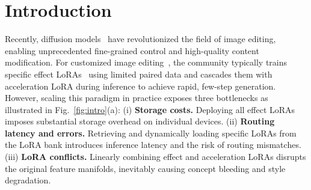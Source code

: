 \section{Introduction}
\label{sec:intro}
Recently, diffusion models~\cite{flux2024,labs2025flux,flux-2-2025,qwenimage,sd1,esser2024scaling,peebles2023scalable} have revolutionized the field of image editing, enabling unprecedented fine-grained control and high-quality content modification. For customized image editing~\cite{mou2025dreamo,gal2022image,kumari2023multi,wu2025dcoardeepconceptinjection, Photodoodle,ye2023ip,zhang2023addingconditionalcontroltexttoimage,guo2025any2anytryon,zhang2025easycontrol,xie2023omnicontrol,huang2024incontextloradiffusiontransformers,liu2025llm4gen,she2025mosaic,liu2025tfcustom}, the community typically trains specific effect LoRAs~\cite{LoRA,huang2024incontextloradiffusiontransformers,OmniConsistency} using limited paired data and cascades them with acceleration LoRA during inference to achieve rapid, few-step generation. 
However, scaling this paradigm in practice exposes three bottlenecks as illustrated in Fig.~\ref{fig:intro}(a): (i) \textbf{Storage costs.} Deploying all effect LoRAs imposes substantial storage overhead on individual devices. (ii) \textbf{Routing latency and errors.} Retrieving and dynamically loading specific LoRAs from the LoRA bank introduces inference latency and the risk of routing mismatches. (iii) \textbf{LoRA conflicts.} Linearly combining effect and acceleration LoRAs disrupts the original feature manifolds, inevitably causing concept bleeding and style degradation.

